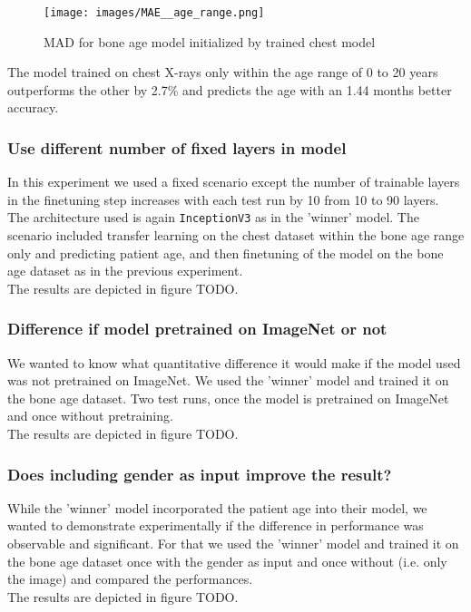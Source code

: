 \documentclass[10pt,twocolumn,letterpaper]{article}
\begin{document}
\begin{figure}[h]
\texttt{[image: images/MAE\_\_age\_range.png]}
\centering
\caption{MAD for bone age model initialized by trained chest model }
\label{fig:maeagerange}
\end{figure}

The model trained on chest X-rays only within the age range of 0 to 20 years outperforms the other by 2.7\% and predicts the age with an 1.44 months better accuracy.

\subsubsection{Use different number of fixed layers in model}
In this experiment we used a fixed scenario except the number of trainable layers in the finetuning step increases with each test run by 10 from 10 to 90 layers. The architecture used is again \verb+InceptionV3+ as in the 'winner' model. The scenario included transfer learning on the chest dataset within the bone age range only and predicting patient age, and then finetuning of the model on the bone age dataset as in the previous experiment.\\
The results are depicted in figure TODO.


\subsubsection{Difference if model pretrained on ImageNet or not}
We wanted to know what quantitative difference it would make if the model used was not pretrained on ImageNet.  We used the 'winner' model and trained it on the bone age dataset. Two test runs, once the model is pretrained on ImageNet and once without pretraining.\\
The results are depicted in figure TODO.

\subsubsection{Does including gender as input improve the result?}
While the 'winner' model incorporated the patient age into their model, we wanted to demonstrate experimentally if the difference in performance was observable and significant. For that we used the 'winner' model and trained it on the bone age dataset once with the gender as input and once without (i.e. only the image) and compared the performances. \\
The results are depicted in figure TODO.
\end{document}
